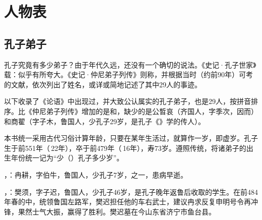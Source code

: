 \chapter*{人\quad 物\quad 表}



\lypdfbookmark\section*{孔子弟子}

孔子究竟有多少弟子？由于年代久远，还没有一个确切的说法。《史记·孔子世家》载：似乎有所夸大。《史记·仲尼弟子列传》则称，并根据当时（约前90年）可考的文献，依次列出了姓名，或详或简地记述了其中29人的事迹。

以下收录了《论语》中出现过，并大致公认属实的孔子弟子，也是29人，按拼音排序。比《仲尼弟子列传》增加的是和，缺少的是公晳哀（齐国人，字季次，因而）和商翟（字子木，鲁国人，少孔子29岁，是孔子《》学的传人）。

本书统一采用古代习俗计算年龄，只要在某年生活过，就算作一岁，即虚岁。孔子生于前551年（\,22年），卒于前479年（\,16年），寿73岁。遵照传统，将诸弟子的出生年份统一记为“少（）孔子多少岁”。

\bigskip

，：冉耕，字伯牛，鲁国人，少孔子7岁，之一，患病早逝。%

，：樊须，字子迟，鲁国人，少孔子46岁，是孔子晚年返鲁后收取的学生。在前484年春的中，统领鲁国左路军，樊迟担任他的车右武士，建议冉求反复申明号令再冲锋，果然士气大振，赢得了胜利。樊迟墓在今山东省济宁市鱼台县。

